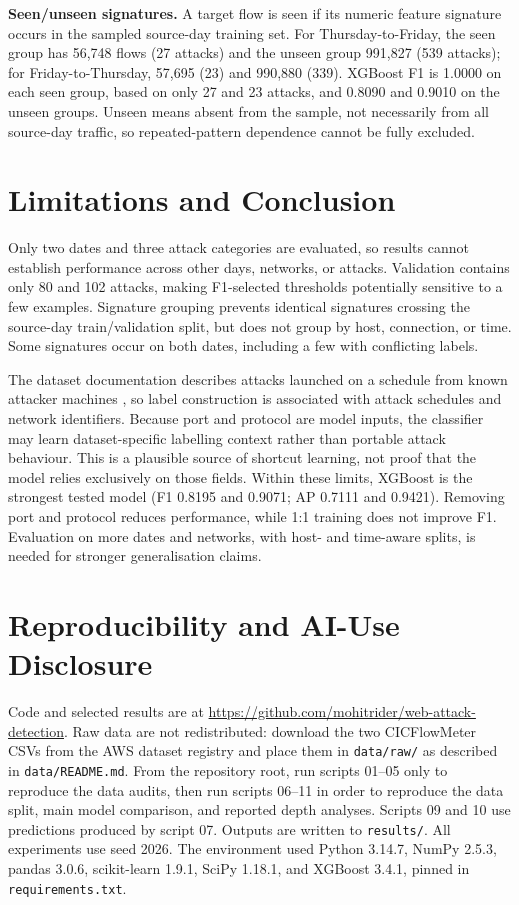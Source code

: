 \documentclass{article}
\begin{document}
\textbf{Seen/unseen signatures.} A target flow is seen if its numeric feature signature occurs in the sampled source-day training set. For Thursday-to-Friday, the seen group has 56,748 flows (27 attacks) and the unseen group 991,827 (539 attacks); for Friday-to-Thursday, 57,695 (23) and 990,880 (339). XGBoost F1 is 1.0000 on each seen group, based on only 27 and 23 attacks, and 0.8090 and 0.9010 on the unseen groups. Unseen means absent from the sample, not necessarily from all source-day traffic, so repeated-pattern dependence cannot be fully excluded.

\section{Limitations and Conclusion}
Only two dates and three attack categories are evaluated, so results cannot establish performance across other days, networks, or attacks. Validation contains only 80 and 102 attacks, making F1-selected thresholds potentially sensitive to a few examples. Signature grouping prevents identical signatures crossing the source-day train/validation split, but does not group by host, connection, or time. Some signatures occur on both dates, including a few with conflicting labels.

The dataset documentation describes attacks launched on a schedule from known attacker machines \cite{sharafaldin2018,cseids2018}, so label construction is associated with attack schedules and network identifiers. Because port and protocol are model inputs, the classifier may learn dataset-specific labelling context rather than portable attack behaviour. This is a plausible source of shortcut learning, not proof that the model relies exclusively on those fields. Within these limits, XGBoost is the strongest tested model (F1 0.8195 and 0.9071; AP 0.7111 and 0.9421). Removing port and protocol reduces performance, while 1:1 training does not improve F1. Evaluation on more dates and networks, with host- and time-aware splits, is needed for stronger generalisation claims.

\section{Reproducibility and AI-Use Disclosure}
{\raggedright
Code and selected results are at \url{https://github.com/mohitrider/web-attack-detection}. Raw data are not redistributed: download the two CICFlowMeter CSVs from the AWS dataset registry and place them in \texttt{data/raw/} as described in \texttt{data/README.md}. From the repository root, run scripts 01--05 only to reproduce the data audits, then run scripts 06--11 in order to reproduce the data split, main model comparison, and reported depth analyses. Scripts 09 and 10 use predictions produced by script 07. Outputs are written to \texttt{results/}. All experiments use seed 2026. The environment used Python 3.14.7, NumPy 2.5.3, pandas 3.0.6, scikit-learn 1.9.1, SciPy 1.18.1, and XGBoost 3.4.1, pinned in \texttt{requirements.txt}.\par}
\end{document}
